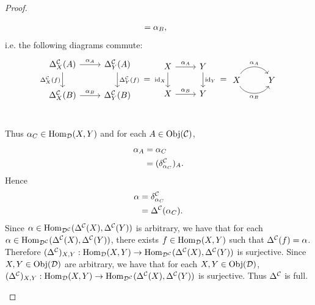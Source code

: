 \documentclass{book}
\begin{document}
\begin{proof}
\begin{itemize}
\begin{itemize}
\begin{align*}
					& = \alpha_B,
				\end{align*}
				i.e. the following diagrams commute:
				\[ 
				\begin{tikzcd}[baseline= 7]
					\Del^{\MC}_X(A)  \arrow[r, "\al_A"]  \arrow[d, "\Del^{\MC}_X(f)"']  & \Del^{\MC}_Y(A)   \arrow[d, "\Del^{\MC}_Y(f)"]\\
					\Del^{\MC}_X(B) \arrow[r, "\al_B"] &  \Del^{\MC}_Y(B) \\
				\end{tikzcd}
				=
				\begin{tikzcd}[baseline= 7]
					X  \arrow[r, "\al_A"]  \arrow[d, "\id_X"']  & Y   \arrow[d, "\id_Y"]\\
					X \arrow[r, "\al_B"] &  Y \\
				\end{tikzcd} 
				= 
				\begin{tikzcd}[baseline= 7]
					X  \arrow[r, bend left=60, swap, "\al_A"']  \arrow[r, bend right= 60, swap, "\al_B"]  & Y    \\
				\end{tikzcd} 
				\]
			\end{itemize}
			Thus $\alpha_C \in \operatorname{Hom}_{\mathcal{D}}(X, Y)$ and for each $A \in \operatorname{Obj}(\mathcal{C})$, 
			\begin{align*}
				\alpha_A
				& = \alpha_C \\
				& = (\delta^{\mathcal{C}}_{\alpha_C})_A.
			\end{align*}  
			Hence
			\begin{align*}
				\alpha 
				& = \delta^{\mathcal{C}}_{\alpha_C} \\
				& = \Delta^{\mathcal{C}}(\alpha_C).
			\end{align*}
			Since $\alpha \in \operatorname{Hom}_{\mathcal{D}^{\mathcal{C}}}(\Delta^{\mathcal{C}}(X), \Delta^{\mathcal{C}}(Y))$ is arbitrary, we have that for each $\alpha \in \operatorname{Hom}_{\mathcal{D}^{\mathcal{C}}}(\Delta^{\mathcal{C}}(X), \Delta^{\mathcal{C}}(Y))$, there exists $f \in \operatorname{Hom}_{\mathcal{D}}(X,Y)$ such that $\Delta^{\mathcal{C}}(f) = \alpha$. Therefore $(\Delta^{\mathcal{C}})_{X,Y}:\operatorname{Hom}_{\mathcal{D}}(X,Y) \rightarrow \operatorname{Hom}_{\mathcal{D}^{\mathcal{C}}}(\Delta^{\mathcal{C}}(X), \Delta^{\mathcal{C}}(Y))$ is surjective. Since $X,Y \in \operatorname{Obj}(\mathcal{D})$ are arbitrary, we have that for each $X,Y \in \operatorname{Obj}(\mathcal{D})$, $(\Delta^{\mathcal{C}})_{X,Y}:\operatorname{Hom}_{\mathcal{D}}(X,Y) \rightarrow \operatorname{Hom}_{\mathcal{D}^{\mathcal{C}}}(\Delta^{\mathcal{C}}(X), \Delta^{\mathcal{C}}(Y))$ is surjective. Thus $\Delta^{\mathcal{C}}$ is full.
		\end{itemize}
	\end{proof}
	
		
	
	
	
	
	
	
	
\end{document}

